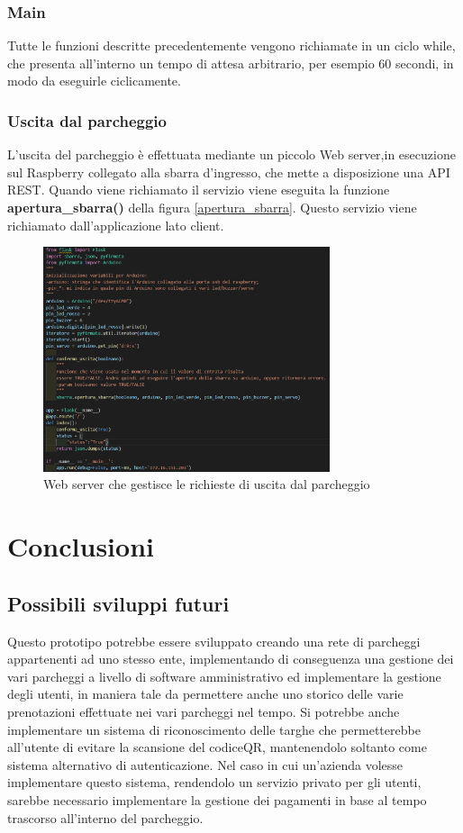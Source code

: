 \documentclass[a4paper,11pt]{report}
\begin{document}
\subsection{Main}
Tutte le funzioni descritte precedentemente vengono richiamate in un ciclo while, che presenta all'interno un tempo di attesa arbitrario, per esempio 60 secondi, in modo da eseguirle ciclicamente.

\subsection{Uscita dal parcheggio}
L'uscita del parcheggio è effettuata mediante un piccolo Web server,in esecuzione sul Raspberry collegato alla sbarra d'ingresso, che mette a disposizione una API REST.  Quando viene richiamato il servizio viene eseguita la funzione \textbf{apertura\_sbarra()} della figura \ref{apertura_sbarra}. 
Questo servizio viene richiamato dall'applicazione lato client.

\begin{figure}[H]
	\centering
	\includegraphics[width=0.75\textwidth]{figure/web_server}
	\caption{Web server che gestisce le richieste di uscita dal parcheggio}
	\label{parcheggio_uscita}
\end{figure}


\chapter{Conclusioni}
\section{Possibili sviluppi futuri}
Questo prototipo potrebbe essere sviluppato creando una rete di parcheggi appartenenti ad uno stesso ente, implementando di conseguenza una gestione dei vari parcheggi a livello di software amministrativo ed implementare la gestione degli utenti, in maniera tale da permettere anche uno storico delle varie prenotazioni effettuate nei vari parcheggi nel tempo. \newline
Si potrebbe anche implementare un sistema di riconoscimento delle targhe che permetterebbe all'utente di evitare la scansione del codiceQR, mantenendolo soltanto come sistema alternativo di autenticazione. \newline
Nel caso in cui un'azienda volesse implementare questo sistema, rendendolo un servizio privato per gli utenti, sarebbe necessario implementare la gestione dei pagamenti in base al tempo trascorso all'interno del parcheggio.
\end{document}
